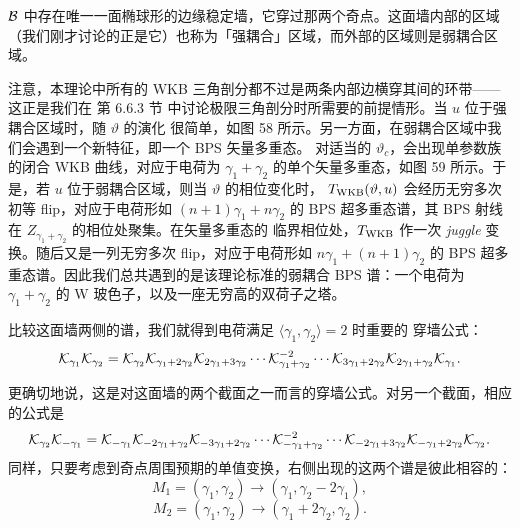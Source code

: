 $\mathcal{B}$ 中存在唯一一面椭球形的边缘稳定墙，它穿过那两个奇点。这面墙内部的区域
（我们刚才讨论的正是它）也称为「强耦合」区域，而外部的区域则是弱耦合区域。


注意，本理论中所有的 WKB 三角剖分都不过是两条内部边横穿其间的环带——这正是我们在
第 6.6.3 节%
中讨论极限三角剖分时所需要的前提情形。当 $u$ 位于强耦合区域时，随 $\vartheta$ 的演化
很简单，如图 58%
所示。另一方面，在弱耦合区域中我们会遇到一个新特征，即一个 BPS 矢量多重态。
对适当的 $\vartheta_c$，会出现单参数族的闭合 WKB 曲线，对应于电荷为 $\gamma_1+\gamma_2$
的单个矢量多重态，如图 59%
所示。于是，若 $u$ 位于弱耦合区域，则当 $\vartheta$ 的相位变化时，
$T_{\rm WKB}(\vartheta,u)$ 会经历无穷多次初等 flip，对应于电荷形如 $(n+1)\gamma_1 + n \gamma_2$
的 BPS 超多重态谱，其 BPS 射线在 $Z_{\gamma_1 + \gamma_2}$ 的相位处聚集。在矢量多重态的
临界相位处，$T_{\rm WKB}$ 作一次 \emph{juggle} 变换。随后又是一列无穷多次 flip，对应于电荷形如
$n \gamma_1 + (n+1) \gamma_2$ 的 BPS 超多重态谱。因此我们总共遇到的是该理论标准的弱耦合
BPS 谱：一个电荷为 $\gamma_1+\gamma_2$ 的 W 玻色子，以及一座无穷高的双荷子之塔。


比较这面墙两侧的谱，我们就得到电荷满足 $\langle \gamma_1, \gamma_2\rangle=2$ 时重要的
穿墙公式：
\begin{equation}\label{eq:wcf-prod2}
\mathcal{K}_{\gamma_1} \mathcal{K}_{\gamma_2}
= \mathcal{K}_{\gamma_2} \mathcal{K}_{\gamma_1+2 \gamma_2}\mathcal{K}_{2\gamma_1+3\gamma_2} \cdots  \mathcal{K}_{\gamma_1+\gamma_2}^{-2} \cdots \mathcal{K}_{3\gamma_1+2\gamma_2}\mathcal{K}_{2\gamma_1+\gamma_2}\mathcal{K}_{\gamma_1}.
\end{equation}

更确切地说，这是对这面墙的两个截面之一而言的穿墙公式。对另一个截面，相应的公式是
\begin{equation}
\mathcal{K}_{\gamma_2}\mathcal{K}_{-\gamma_1}
= \mathcal{K}_{-\gamma_1} \mathcal{K}_{-2\gamma_1+ \gamma_2}\mathcal{K}_{-3\gamma_1+2\gamma_2} \cdots  \mathcal{K}_{-\gamma_1+\gamma_2}^{-2} \cdots \mathcal{K}_{-2\gamma_1+3\gamma_2}\mathcal{K}_{-\gamma_1+2\gamma_2}\mathcal{K}_{\gamma_2}.
\end{equation}
同样，只要考虑到奇点周围预期的单值变换，右侧出现的这两个谱是彼此相容的：
\begin{equation}
M_1 = (\gamma_1, \gamma_2) \to (\gamma_1, \gamma_2-2 \gamma_1),
\end{equation}
\begin{equation}
M_2 = (\gamma_1, \gamma_2) \to (\gamma_1+2 \gamma_2, \gamma_2).
\end{equation}


